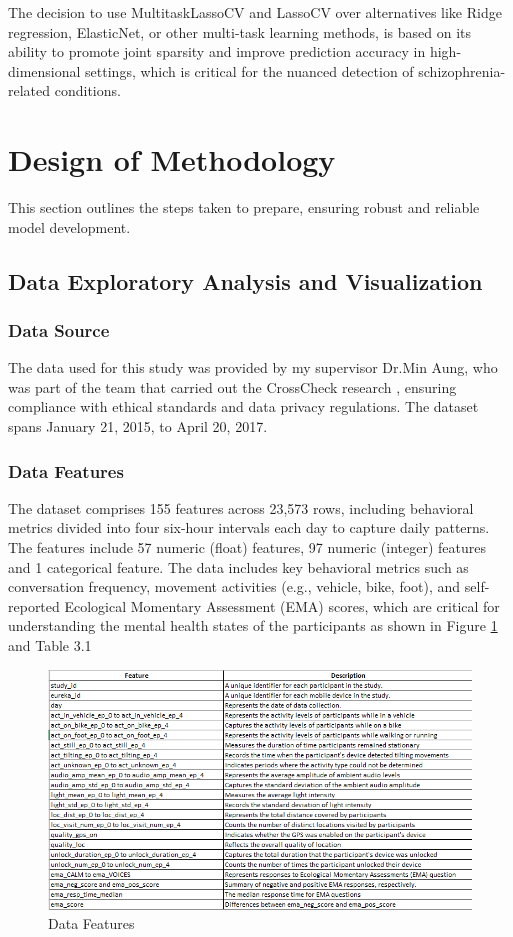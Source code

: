  The decision to use MultitaskLassoCV and LassoCV over alternatives like Ridge regression, ElasticNet, or other multi-task learning methods, is based on its ability to promote joint sparsity and improve prediction accuracy in high-dimensional settings, which is critical for the nuanced detection of schizophrenia-related conditions.


\section{Design of Methodology}
This section outlines the steps taken to prepare, ensuring robust and reliable model development.
\subsection {Data Exploratory Analysis and Visualization} 
\subsubsection{Data Source} 
The data used for this study was provided by my supervisor Dr.Min Aung, who was part of the team that carried out the CrossCheck research \citep{wang2016crosscheck}, ensuring compliance with ethical standards and data privacy regulations. The dataset spans January 21, 2015, to April 20, 2017.

\subsubsection{Data Features} 
The dataset comprises 155 features across 23,573 rows, including behavioral metrics divided into four six-hour intervals each day to capture daily patterns. The features include 57 numeric (float) features, 97 numeric (integer) features and 1 categorical feature. The data includes key behavioral metrics such as conversation frequency, movement activities (e.g., vehicle, bike, foot), and self-reported Ecological Momentary Assessment (EMA) scores, which are critical for understanding the mental health states of the participants as shown in Figure \ref{feat} and Table 3.1

\begin{figure}[H]
    \centering
\includegraphics[scale=0.50]{feature.png}
\caption{Data Features}
\label{feat}
\end{figure}


